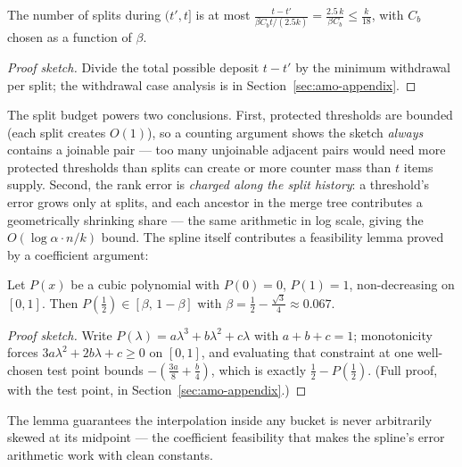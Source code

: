 \begin{lemma}
\label{lem:amo-spline-split}
The number of splits during $(t', t]$ is at most
$\frac{t - t'}{\beta C_b t / (2.5 k)} = \frac{2.5\,k}{\beta C_b} \le
\frac{k}{18}$, with $C_b$ chosen as a function of $\beta$. \eop
\end{lemma}

\begin{proof}[Proof sketch]
Divide the total possible deposit $t - t'$ by the minimum withdrawal per
split; the withdrawal case analysis is in Section~\ref{sec:amo-appendix}.
\end{proof}

The split budget powers two conclusions. First, protected thresholds are
bounded (each split creates $O(1)$), so a counting argument shows the
sketch \emph{always} contains a joinable pair --- too many unjoinable
adjacent pairs would need more protected thresholds than splits can create
or more counter mass than $t$ items supply. Second, the rank error is
\emph{charged along the split history}: a threshold's error grows only at
splits, and each ancestor in the merge tree contributes a geometrically
shrinking share --- the same arithmetic in log scale, giving the
$O(\log \alpha \cdot n/k)$ bound. The spline itself contributes a
feasibility lemma proved by a coefficient argument:

\begin{lemma}
\label{lem:amo-spline-midpoint}
Let $P(x)$ be a cubic polynomial with $P(0) = 0$, $P(1) = 1$, non-decreasing
on $[0,1]$. Then $P(\tfrac12) \in [\beta,\, 1 - \beta]$ with
$\beta = \tfrac12 - \tfrac{\sqrt{3}}{4} \approx 0.067$. \eop
\end{lemma}

\begin{proof}[Proof sketch]
Write $P(\lambda) = a\lambda^3 + b\lambda^2 + c\lambda$ with $a + b + c =
1$; monotonicity forces $3a\lambda^2 + 2b\lambda + c \ge 0$ on $[0,1]$, and
evaluating that constraint at one well-chosen test point bounds
$-(\tfrac{3a}{8} + \tfrac{b}{4})$, which is exactly $\tfrac12 -
P(\tfrac12)$. (Full proof, with the test point, in
Section~\ref{sec:amo-appendix}.)
\end{proof}

The lemma guarantees the interpolation inside any bucket is never
arbitrarily skewed at its midpoint --- the coefficient feasibility that
makes the spline's error arithmetic work with clean constants.

